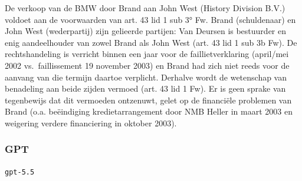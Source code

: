 \documentclass[
  dutch,
  a4paper,
]{article}
\begin{document}
De verkoop van de BMW door Brand aan John West (History Division B.V.) voldoet aan de voorwaarden van art. 43 lid 1 sub 3° Fw. Brand (schuldenaar) en John West (wederpartij) zijn gelieerde partijen: Van Deursen is bestuurder en enig aandeelhouder van zowel Brand als John West (art. 43 lid 1 sub 3b Fw). De rechtshandeling is verricht binnen een jaar voor de faillietverklaring (april/mei 2002 vs.~faillissement 19 november 2003) en Brand had zich niet reeds voor de aanvang van die termijn daartoe verplicht. Derhalve wordt de wetenschap van benadeling aan beide zijden vermoed (art. 43 lid 1 Fw). Er is geen sprake van tegenbewijs dat dit vermoeden ontzenuwt, gelet op de financiële problemen van Brand (o.a. beëindiging kredietarrangement door NMB Heller in maart 2003 en weigering verdere financiering in oktober 2003).

\newpage


\subsubsection{GPT}\label{gpt-19}

\texttt{gpt-5.5}
\end{document}
